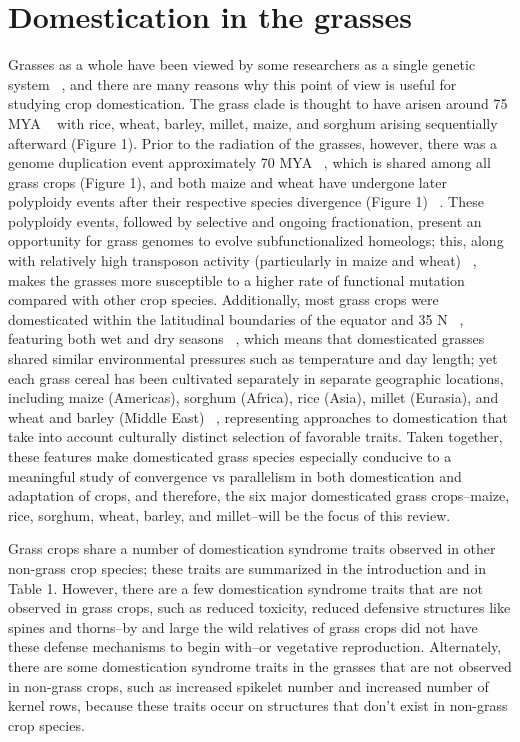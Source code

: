 \documentclass[12pt]{article}
\begin{document}
\section*{Domestication in the grasses}
Grasses as a whole have been viewed by some researchers as a single genetic system ~\cite{pmid8379002, pmid11244100}, and there are many reasons why this point of view is useful for studying crop domestication.  The grass clade is thought to have arisen around 75 MYA ~\cite{BOUCHENAKKHELLADI2010, Kellogg2001} with rice, wheat, barley, millet, maize, and sorghum arising sequentially afterward (Figure 1). Prior to the radiation of the grasses, however, there was a genome duplication event approximately 70 MYA ~\cite{Paterson2004}, which is shared among all grass crops (Figure 1), and both maize and wheat have undergone later polyploidy events after their respective species divergence (Figure 1) ~\cite{Levy2002}. These polyploidy events, followed by selective and ongoing fractionation, present an opportunity for grass genomes to evolve subfunctionalized homeologs; this, along with relatively high transposon activity (particularly in maize and wheat) ~\cite{Wicker2016, Lisch2001}, makes the grasses more susceptible to a higher rate of functional mutation compared with other crop species.  Additionally, most grass crops were domesticated within the latitudinal boundaries of the equator and 35 N ~\cite{Jain1993, Gepts2010}, featuring both wet and dry seasons ~\cite{Jain1993}, which means that domesticated grasses shared similar environmental pressures such as temperature and day length; yet each grass cereal has been cultivated separately in separate geographic locations, including maize (Americas), sorghum (Africa), rice (Asia), millet (Eurasia), and wheat and barley (Middle East) ~\cite{Glmin2009}, representing approaches to domestication that take into account culturally distinct selection of favorable traits. Taken together, these features make domesticated grass species especially conducive to a meaningful study of convergence vs parallelism in both domestication and adaptation of crops, and therefore, the six major domesticated grass crops--maize, rice, sorghum, wheat, barley, and millet--will be the focus of this review. 

Grass crops share a number of domestication syndrome traits observed in other non-grass crop species; these traits are summarized in the introduction and in Table 1.  However, there are a few domestication syndrome traits that are not observed in grass crops, such as reduced toxicity, reduced defensive structures like spines and thorns--by and large the wild relatives of grass crops did not have these defense mechanisms to begin with--or vegetative reproduction. Alternately, there are some domestication syndrome traits in the grasses that are not observed in non-grass crops, such as increased spikelet number and increased number of kernel rows, because these traits occur on structures that don’t exist in non-grass crop species.  
\end{document}
